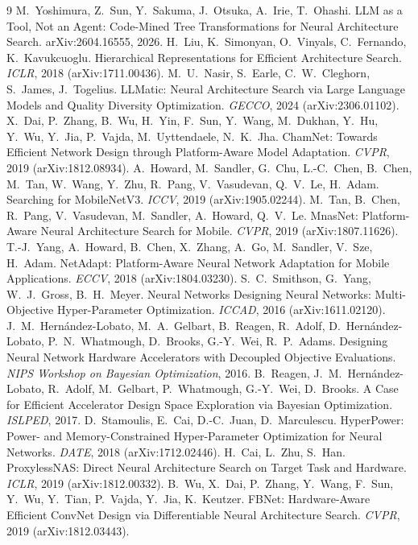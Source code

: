 \documentclass[11pt,a4paper]{article}
\begin{document}
\begin{thebibliography}{9}
 M.~Yoshimura, Z.~Sun, Y.~Sakuma, J.~Otsuka, A.~Irie, T.~Ohashi. LLM as a Tool, Not an Agent: Code-Mined Tree Transformations for Neural Architecture Search. arXiv:2604.16555, 2026.
 H.~Liu, K.~Simonyan, O.~Vinyals, C.~Fernando, K.~Kavukcuoglu. Hierarchical Representations for Efficient Architecture Search. \emph{ICLR}, 2018 (arXiv:1711.00436).
 M.~U.~Nasir, S.~Earle, C.~W.~Cleghorn, S.~James, J.~Togelius. LLMatic: Neural Architecture Search via Large Language Models and Quality Diversity Optimization. \emph{GECCO}, 2024 (arXiv:2306.01102).
 X.~Dai, P.~Zhang, B.~Wu, H.~Yin, F.~Sun, Y.~Wang, M.~Dukhan, Y.~Hu, Y.~Wu, Y.~Jia, P.~Vajda, M.~Uyttendaele, N.~K.~Jha. ChamNet: Towards Efficient Network Design through Platform-Aware Model Adaptation. \emph{CVPR}, 2019 (arXiv:1812.08934).
 A.~Howard, M.~Sandler, G.~Chu, L.-C.~Chen, B.~Chen, M.~Tan, W.~Wang, Y.~Zhu, R.~Pang, V.~Vasudevan, Q.~V.~Le, H.~Adam. Searching for MobileNetV3. \emph{ICCV}, 2019 (arXiv:1905.02244).
 M.~Tan, B.~Chen, R.~Pang, V.~Vasudevan, M.~Sandler, A.~Howard, Q.~V.~Le. MnasNet: Platform-Aware Neural Architecture Search for Mobile. \emph{CVPR}, 2019 (arXiv:1807.11626).
 T.-J.~Yang, A.~Howard, B.~Chen, X.~Zhang, A.~Go, M.~Sandler, V.~Sze, H.~Adam. NetAdapt: Platform-Aware Neural Network Adaptation for Mobile Applications. \emph{ECCV}, 2018 (arXiv:1804.03230).
 S.~C.~Smithson, G.~Yang, W.~J.~Gross, B.~H.~Meyer. Neural Networks Designing Neural Networks: Multi-Objective Hyper-Parameter Optimization. \emph{ICCAD}, 2016 (arXiv:1611.02120).
 J.~M.~Hern\'andez-Lobato, M.~A.~Gelbart, B.~Reagen, R.~Adolf, D.~Hern\'andez-Lobato, P.~N.~Whatmough, D.~Brooks, G.-Y.~Wei, R.~P.~Adams. Designing Neural Network Hardware Accelerators with Decoupled Objective Evaluations. \emph{NIPS Workshop on Bayesian Optimization}, 2016.
 B.~Reagen, J.~M.~Hern\'andez-Lobato, R.~Adolf, M.~Gelbart, P.~Whatmough, G.-Y.~Wei, D.~Brooks. A Case for Efficient Accelerator Design Space Exploration via Bayesian Optimization. \emph{ISLPED}, 2017.
 D.~Stamoulis, E.~Cai, D.-C.~Juan, D.~Marculescu. HyperPower: Power- and Memory-Constrained Hyper-Parameter Optimization for Neural Networks. \emph{DATE}, 2018 (arXiv:1712.02446).
 H.~Cai, L.~Zhu, S.~Han. ProxylessNAS: Direct Neural Architecture Search on Target Task and Hardware. \emph{ICLR}, 2019 (arXiv:1812.00332).
 B.~Wu, X.~Dai, P.~Zhang, Y.~Wang, F.~Sun, Y.~Wu, Y.~Tian, P.~Vajda, Y.~Jia, K.~Keutzer. FBNet: Hardware-Aware Efficient ConvNet Design via Differentiable Neural Architecture Search. \emph{CVPR}, 2019 (arXiv:1812.03443).

\end{thebibliography}
\end{document}
